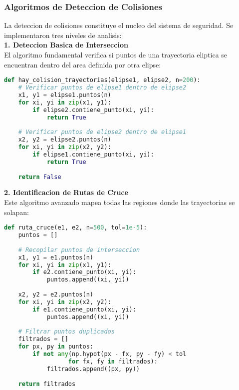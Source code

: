 \documentclass[12pt,a4paper]{article}
\begin{document}
\subsubsection{Algoritmos de Deteccion de Colisiones}

La deteccion de colisiones constituye el nucleo del sistema de seguridad. Se implementaron tres niveles de analisis:\\

\textbf{1. Deteccion Basica de Interseccion}\\

El algoritmo fundamental verifica si puntos de una trayectoria eliptica se encuentran dentro del area definida por otra elipse:

\begin{lstlisting}[language=Python, caption=Algoritmo de deteccion basica]
def hay_colision_trayectorias(elipse1, elipse2, n=200):
    # Verificar puntos de elipse1 dentro de elipse2
    x1, y1 = elipse1.puntos(n)
    for xi, yi in zip(x1, y1):
        if elipse2.contiene_punto(xi, yi):
            return True
    
    # Verificar puntos de elipse2 dentro de elipse1
    x2, y2 = elipse2.puntos(n)
    for xi, yi in zip(x2, y2):
        if elipse1.contiene_punto(xi, yi):
            return True
    
    return False
\end{lstlisting}

\textbf{2. Identificacion de Rutas de Cruce}\\

Este algoritmo avanzado mapea todas las regiones donde las trayectorias se solapan:

\begin{lstlisting}[language=Python, caption=Algoritmo de rutas de cruce]
def ruta_cruce(e1, e2, n=500, tol=1e-5):
    puntos = []
    
    # Recopilar puntos de interseccion
    x1, y1 = e1.puntos(n)
    for xi, yi in zip(x1, y1):
        if e2.contiene_punto(xi, yi):
            puntos.append((xi, yi))
    
    x2, y2 = e2.puntos(n)
    for xi, yi in zip(x2, y2):
        if e1.contiene_punto(xi, yi):
            puntos.append((xi, yi))
    
    # Filtrar puntos duplicados
    filtrados = []
    for px, py in puntos:
        if not any(np.hypot(px - fx, py - fy) < tol 
                  for fx, fy in filtrados):
            filtrados.append((px, py))
    
    return filtrados
\end{lstlisting}
\end{document}
